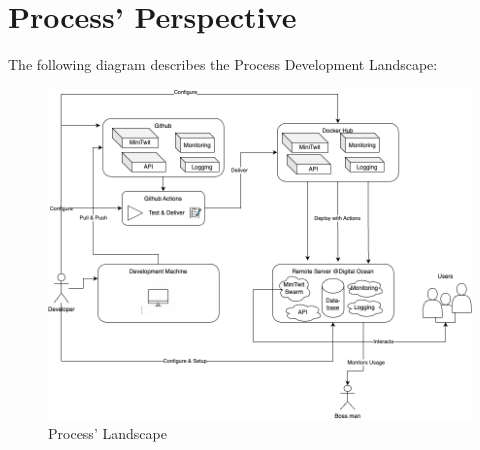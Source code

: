 \documentclass[11pt]{article}
\begin{document}
\section{Process' Perspective}
The following diagram describes the Process Development Landscape:
\begin{figure}[!h]
    \centering
    \includegraphics[width=\textwidth]{images/process.png}
    \caption{Process' Landscape}
    \label{fig:process-overview}
\end{figure}
\end{document}
